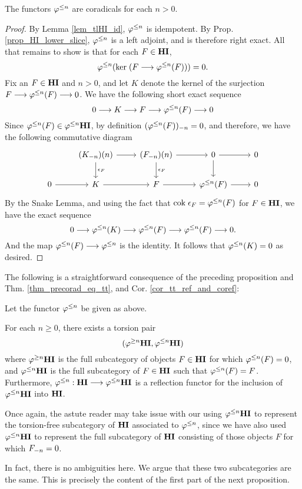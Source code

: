 \begin{prop}
The functors $\tlHI{n}$ are coradicals for each $n > 0$.
\end{prop}
\begin{proof}
By Lemma \ref{lem_tlHI_id}, $\tlHI{n}$ is idempotent. By Prop. 
\ref{prop_HI_lower_slice}, $\tlHI{n}$ is a left adjoint, and
is therefore right exact. All that remains to show is that for
each $F \in \HI$,
\[
\tlHI{n}(\ker (F \to \tlHI{n}(F))) = 0.
\]
Fix an $F \in \HI$ and $n > 0$, and let $K$ denote the kernel of 
the surjection $F \to \tlHI{n}(F) \to 0$. We have the following
short exact sequence 
\[
0 \to K \to F \to \tlHI{n}(F) \to 0
\]
Since $\tlHI{n}(F) \in \tlHI{n}\HI$, by definition 
$\RHI[n]{(\tlHI{n}(F))} = 0$, and therefore, we have the following
commutative diagram
\[
\begin{tikzcd}
{} &\LHI[n]{(\RHI[n]{K})} \arrow{d}{\cuHI_F} \arrow{r}
   &\LHI[n]{(\RHI[n]{F})} \arrow{d}{\cuHI_F} \arrow{r}
   &0 \arrow{d} \arrow{r}
   &0 \\
0 \arrow{r} &
  K \arrow{r}&
  F \arrow{r}&
  \tlHI{n}(F) \arrow{r}&
  0
\end{tikzcd}
\]
By the Snake Lemma, and using the fact that $\cok \cuHI_F = 
\tlHI{n}(F)$ for $F \in \HI$, we have the exact sequence
\[
0 \to \tlHI{n}(K) \to \tlHI{n}(F) \to \tlHI{n}(F) \to 0.
\]
And the map $\tlHI{n}(F) \to \tlHI{n}$ is the identity. It follows 
that $\tlHI{n}(K) = 0$ as desired.
\end{proof}

The following is a straightforward consequence of the preceding 
proposition and Thm. \ref{thm_precorad_eq_tt}, and Cor. 
\ref{cor_tt_ref_and_coref}:

\begin{cor}
Let the functor $\tlHI{n}$ be given as above.

For each $n \geq 0$, there exists a torsion pair
\[
(\tgHI{n}\HI, \tlHI{n}\HI)
\]
where $\tgHI{n}\HI$ is the full subcategory of objects $F \in \HI$
for which $\tlHI{n}(F) = 0$, and $\tlHI{n}\HI$ is the full 
subcategory of $F \in \HI$ such that $\tlHI{n}(F) = F$. Furthermore, 
$\tlHI{n} : \HI \to \tlHI{n}\HI$ is a reflection functor for the
inclusion of $\tlHI{n} \HI$ into $\HI$.
\end{cor}

\begin{rmk}
Once again, the astute reader may take issue with our using 
$\tlHI{n} \HI$ to represent the torsion-free subcategory of $\HI$ 
associated to $\tlHI{n}$, since we have also used $\tlHI{n} \HI$ 
to represent the full subcategory of $\HI$ consisting of those 
objects $F$ for which $\RHI[n]{F} = 0$.

In fact, there is no ambiguities here. We argue that these two 
subcategories are the same. This is precisely the content of the
first part of the next proposition.
\end{rmk}

